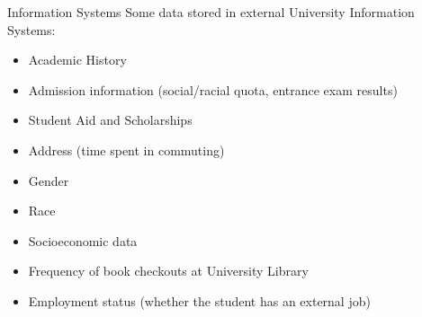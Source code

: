 \begin{frame}{Information Systems}
    Some data stored in external University Information Systems:
    \begin{itemize}[<alert@+>]\color{gray}
        \item Academic History
        \item Admission information (social/racial quota, entrance exam results)
        \item Student Aid and Scholarships
        \item Address (time spent in commuting)
        \item Gender
        \item Race
        \item Socioeconomic data
        \item Frequency of book checkouts at University Library
        \item Employment status (whether the student has an external job)
    \end{itemize}
\end{frame}

